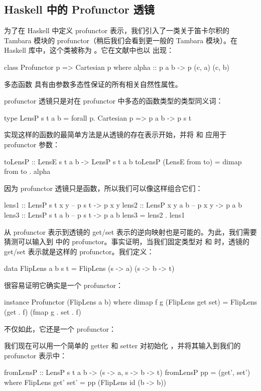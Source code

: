 \documentclass[DaoFP]{subfiles}
\begin{document}
\subsection{Haskell 中的 Profunctor 透镜}

为了在 Haskell 中定义 profunctor 表示，我们引入了一类关于笛卡尔积的 Tambara 模块的 profunctor（稍后我们会看到更一般的 Tambara 模块）。在 Haskell 库中，这个类被称为 。它在文献中也以  出现：
\begin{haskell}
class Profunctor p => Cartesian p where
  alpha :: p a b -> p (c, a) (c, b)
\end{haskell}
多态函数  具有由参数多态性保证的所有相关自然性属性。

profunctor 透镜只是对在  profunctor 中多态的函数类型的类型同义词：
\begin{haskell}
type LensP s t a b = forall p. Cartesian p => p a b -> p s t
\end{haskell}

实现这样的函数的最简单方法是从透镜的存在表示开始，并将  和  应用于 profunctor 参数：
\begin{haskell}
toLensP :: LensE s t a b -> LensP s t a b
toLensP (LensE from to) = dimap from to . alpha
\end{haskell}

因为 profunctor 透镜只是函数，所以我们可以像这样组合它们：
\begin{haskell}
lens1 :: LensP s t x y 
-- p s t -> p x y
lens2 :: LensP x y a b 
-- p x y -> p a b
lens3 :: LensP s t a b 
-- p s t -> p a b
lens3 = lens2 . lens1
\end{haskell}

从 profunctor 表示到透镜的 get/set 表示的逆向映射也是可能的。为此，我们需要猜测可以输入到  中的 profunctor。事实证明，当我们固定类型对  和  时，透镜的 get/set 表示就是这样的 profunctor。我们定义：
\begin{haskell}
data FlipLens a b s t = FlipLens (s -> a) (s -> b -> t)
\end{haskell}
很容易证明它确实是一个 profunctor：
\begin{haskell}
instance Profunctor (FlipLens a b) where
  dimap f g (FlipLens get set) = FlipLens (get . f) (fmap g . set . f)
\end{haskell}
不仅如此，它还是一个  profunctor：
我们现在可以用一个简单的 getter 和 setter 对初始化 ，并将其输入到我们的 profunctor 表示中：
\begin{haskell}
fromLensP :: LensP s t a b -> (s -> a, s -> b -> t)
fromLensP pp = (get', set')
  where FlipLens get' set' = pp (FlipLens id (\s b -> b))
\end{haskell}
\end{document}
